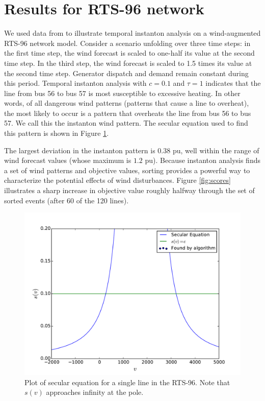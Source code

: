 \documentclass[conference]{IEEEtran}
\begin{document}
\section{Results for RTS-96 network}\label{sec:results}

We used data from \cite{pandzic} to illustrate temporal instanton analysis on a wind-augmented RTS-96 network model. Consider a scenario unfolding over three time steps: in the first time step, the wind forecast is scaled to one-half its value at the second time step. In the third step, the wind forecast is scaled to 1.5 times its value at the second time step. Generator dispatch and demand remain constant during this period. Temporal instanton analysis with $c=0.1$ and $\tau=1$ indicates that the line from bus 56 to bus 57 is most susceptible to excessive heating. In other words, of all dangerous wind patterns (patterns that cause a line to overheat), the most likely to occur is a pattern that overheats the line from bus 56 to bus 57. We call this the instanton wind pattern. The secular equation used to find this pattern is shown in Figure \ref{fig:secular}.

The largest deviation in the instanton pattern is $0.38$ pu, well within the range of wind forecast values (whose maximum is $1.2$ pu). Because instanton analysis finds a set of wind patterns and objective values, sorting provides a powerful way to characterize the potential effects of wind disturbances. Figure \eqref{fig:scores} illustrates a sharp increase in objective value roughly halfway through the set of sorted events (after 60 of the 120 lines).

\begin{figure}
\centering
\includegraphics[width=1\linewidth]{../images/secular2}
\caption{Plot of secular equation for a single line in the RTS-96. Note that $s(v)$ approaches infinity at the pole.}
\label{fig:secular}
\end{figure}
\end{document}
